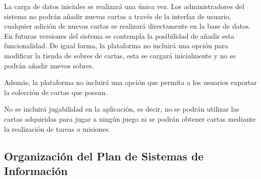 La carga de datos iniciales se realizará una única vez. Los administradores del sistema no podrán añadir nuevas cartas a través de la interfaz de usuario, 
cualquier adición de nuevas cartas se realizará directamente en la base de datos. En futuras versiones del sistema se contempla la posibilidad de añadir esta funcionalidad.
De igual forma, la plataforma no incluirá una opción para modificar la tienda de sobres de cartas, esta se cargará inicialmente y no se podrán añadir nuevos sobres.

Además, la plataforma no incluirá una opción que permita a los usuarios exportar la colección de cartas que posean. 

No se incluirá jugabilidad en la aplicación, es decir, no se podrán utilizar las cartas adquiridas para jugar a ningún juego ni se podrán obtener cartas mediante la realización de tareas o misiones. 



\subsection{Organización del Plan de Sistemas de Información }

